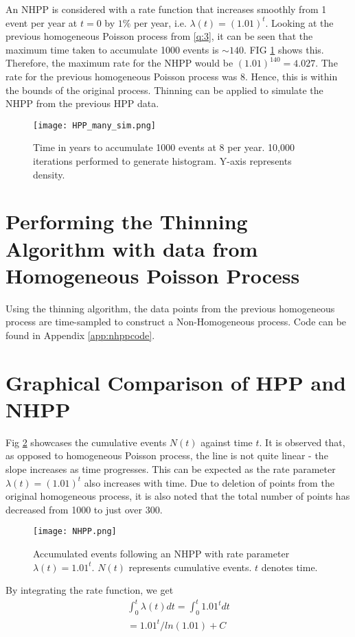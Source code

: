 \documentclass[%
 reprint,
 amsmath,amssymb,
 aps,
]{revtex4-2}
\theoremstyle{definition}
\begin{document}
An NHPP is considered with a rate function that increases smoothly from 1 event per year at $t = 0$ by $1\%$ per year, i.e. $\lambda(t) = (1.01)^t$. Looking at the previous homogeneous Poisson process from \ref{q:3}, it can be seen that the maximum time taken to accumulate 1000 events is $\sim140$. FIG \ref{fig:hpp_many_sim} shows this. Therefore, the maximum rate for the NHPP would be $(1.01)^{140} = 4.027$. The rate for the previous homogeneous Poisson process was 8. Hence, this is within the bounds of the original process. Thinning can be applied to simulate the NHPP from the previous HPP data.

\begin{figure}
\centering
\texttt{[image: HPP\_many\_sim.png]}
\caption{\label{fig:hpp_many_sim}Time in years to accumulate 1000 events at 8 per year. 10,000 iterations performed to generate histogram. Y-axis represents density.}
\end{figure}

\section{\label{q:5}Performing the Thinning Algorithm with data from Homogeneous Poisson Process}
Using the thinning algorithm, the data points from the previous homogeneous process are time-sampled to construct a Non-Homogeneous process. Code can be found in Appendix \ref{app:nhppcode}.

\section{\label{q:6}Graphical Comparison of HPP and NHPP}
Fig \ref{fig:nhpp} showcases the cumulative events $N(t)$ against time $t$. It is observed that, as opposed to homogeneous Poisson process, the line is not quite linear - the slope increases as time progresses. This can be expected as the rate parameter $\lambda(t) = (1.01)^t$ also increases with time. Due to deletion of points from the original homogeneous process, it is also noted that the total number of points has decreased from 1000 to just over 300.

\begin{figure}
\centering
\texttt{[image: NHPP.png]}
\caption{\label{fig:nhpp}Accumulated events following an NHPP with rate parameter $\lambda(t) = 1.01^t$. $N(t)$ represents cumulative events. $t$ denotes time.}
\end{figure}

By integrating the rate function, we get 
\begin{gather*}
\int_{0}^{t}\lambda(t)dt = \int_{0}^{t}1.01^tdt\\
=1.01^t/ln(1.01) + C
\end{gather*}
\end{document}
